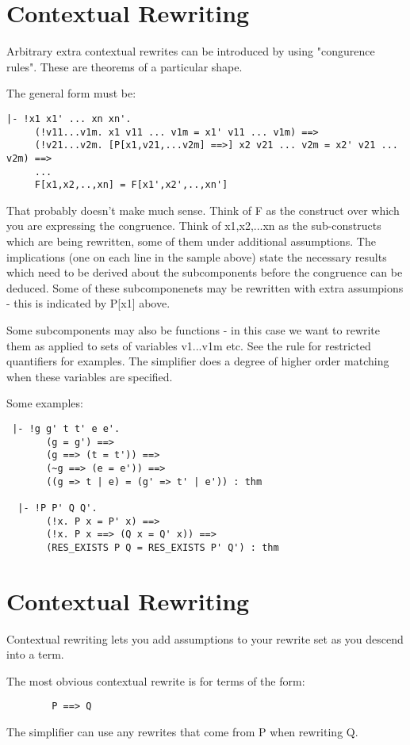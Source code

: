 

\section{Contextual Rewriting}

Arbitrary extra contextual rewrites can be introduced by
using "congurence rules".  These are theorems of a particular
shape.

The general form must be:
\begin{verbatim}
|- !x1 x1' ... xn xn'.
     (!v11...v1m. x1 v11 ... v1m = x1' v11 ... v1m) ==>
     (!v21...v2m. [P[x1,v21,...v2m] ==>] x2 v21 ... v2m = x2' v21 ... v2m) ==>
     ...
     F[x1,x2,..,xn] = F[x1',x2',..,xn']
\end{verbatim}
That probably doesn't make much sense.  Think of F as the construct
over which you are expressing the congruence.  Think of x1,x2,...xn
as the sub-constructs which are being rewritten, some of them under
additional assumptions.  The implications (one on each line in the 
sample above) state the necessary results which need to be derived 
about the subcomponents before the congruence can be deduced.  Some
of these subcomponenets may be rewritten with extra assumpions - this
is indicated by P[x1] above.

Some subcomponents may also be functions - in this case we want
to rewrite them as applied to sets of variables v1...v1m etc.
See the rule for restricted quantifiers for examples.
The simplifier does a degree of higher order matching when
these variables are specified.

Some examples:
\begin{verbatim}
 |- !g g' t t' e e'.
       (g = g') ==>
       (g ==> (t = t')) ==>
       (~g ==> (e = e')) ==>
       ((g => t | e) = (g' => t' | e')) : thm

  |- !P P' Q Q'.
       (!x. P x = P' x) ==>
       (!x. P x ==> (Q x = Q' x)) ==>
       (RES_EXISTS P Q = RES_EXISTS P' Q') : thm
\end{verbatim}




\section{Contextual Rewriting}

Contextual rewriting lets you add assumptions to your rewrite
set as you descend into a term.

The most obvious contextual rewrite is for terms of the form:
\begin{verbatim}
		P ==> Q
\end{verbatim}
The simplifier can use any rewrites that come from P
when rewriting Q.  

